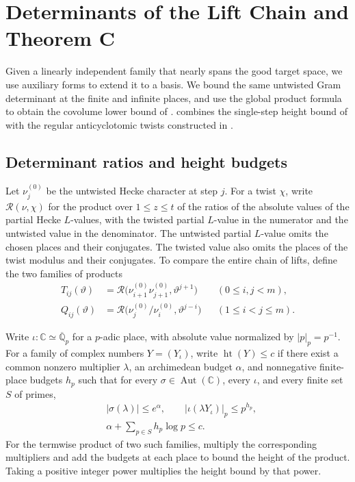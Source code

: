 \chapter{Determinants of the Lift Chain and Theorem C}
\label{chap:determinant}

\begin{chapterguide}
Given a linearly independent family that nearly spans the good target space, we use auxiliary forms to extend it to a basis. We bound the same untwisted Gram determinant at the finite and infinite places, and use the global product formula to obtain the covolume lower bound of .  combines the single-step height bound of  with the regular anticyclotomic twists constructed in .
\end{chapterguide}

\section{Determinant ratios and height budgets}
\label{sec:c-height}

Let $\nu_j^{(0)}$ be the untwisted Hecke character at step $j$. For a twist $\chi$, write $\mathcal R(\nu,\chi)$ for the product over $1\le z\le t$ of the ratios of the absolute values of the partial Hecke $L$-values, with the twisted partial $L$-value in the numerator and the untwisted value in the denominator. The untwisted partial $L$-value omits the chosen places and their conjugates. The twisted value also omits the places of the twist modulus and their conjugates. To compare the entire chain of lifts, define the two families of products
\[
 \begin{aligned}
 T_{ij}(\vartheta)&=\mathcal R\bigl(\nu_{i+1}^{(0)}\nu_{j+1}^{(0)},\vartheta^{j+1}\bigr)
      &&(0\le i,j<m),\\
 Q_{ij}(\vartheta)&=\mathcal R\bigl(\nu_j^{(0)}/\nu_i^{(0)},\vartheta^{j-i}\bigr)
      &&(1\le i<j\le m).
 \end{aligned}
\]

Write $\iota\colon\mathbb C\simeq\overline{\mathbb Q}_p$ for a $p$-adic place, with absolute value normalized by $|p|_p=p^{-1}$. For a family of complex numbers $Y=(Y_\iota)$, write $\operatorname{ht}(Y)\le c$ if there exist a common nonzero multiplier $\lambda$, an archimedean budget $\alpha$, and nonnegative finite-place budgets $h_p$ such that for every $\sigma\in\operatorname{Aut}(\mathbb C)$, every $\iota$, and every finite set $S$ of primes,
\begin{equation}\label{eq:height-budget}\begin{aligned}
 &|\sigma(\lambda)|\le e^\alpha,\qquad |\iota(\lambda Y_\iota)|_p\le p^{h_p},
\\
&\alpha+\sum_{p\in S} h_p\log p\le c.
\end{aligned}\end{equation}
For the termwise product of two such families, multiply the corresponding multipliers and add the budgets at each place to bound the height of the product. Taking a positive integer power multiplies the height bound by that power.

